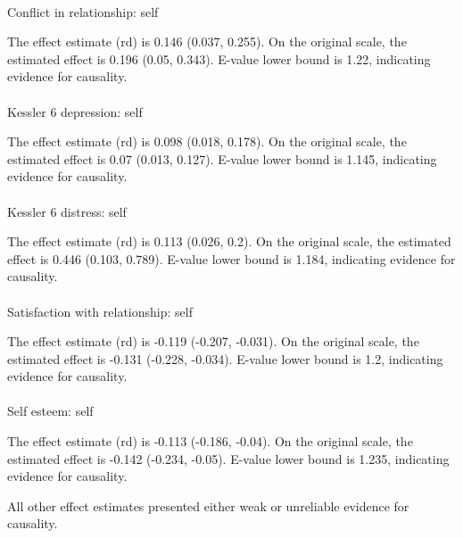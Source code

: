 \documentclass[
  single column]{article}
\makeatletter
\let\oldparagraph\paragraph
\renewcommand{\paragraph}{
    \@ifstar
      \xxxParagraphStar
      \xxxParagraphNoStar
  }
\newcommand{\xxxParagraphStar}[1]{\oldparagraph*{#1}\mbox{}}
\newcommand{\xxxParagraphNoStar}[1]{\oldparagraph{#1}\mbox{}}
\makeatother
\begin{document}
\paragraph{Conflict in relationship:
self}\label{conflict-in-relationship-self-1}

The effect estimate (rd) is 0.146 (0.037, 0.255). On the original scale,
the estimated effect is 0.196 (0.05, 0.343). E-value lower bound is
1.22, indicating evidence for causality.

\paragraph{Kessler 6 depression:
self}\label{kessler-6-depression-self-7}

The effect estimate (rd) is 0.098 (0.018, 0.178). On the original scale,
the estimated effect is 0.07 (0.013, 0.127). E-value lower bound is
1.145, indicating evidence for causality.

\paragraph{Kessler 6 distress: self}\label{kessler-6-distress-self-6}

The effect estimate (rd) is 0.113 (0.026, 0.2). On the original scale,
the estimated effect is 0.446 (0.103, 0.789). E-value lower bound is
1.184, indicating evidence for causality.

\paragraph{Satisfaction with relationship:
self}\label{satisfaction-with-relationship-self-3}

The effect estimate (rd) is -0.119 (-0.207, -0.031). On the original
scale, the estimated effect is -0.131 (-0.228, -0.034). E-value lower
bound is 1.2, indicating evidence for causality.

\paragraph{Self esteem: self}\label{self-esteem-self-9}

The effect estimate (rd) is -0.113 (-0.186, -0.04). On the original
scale, the estimated effect is -0.142 (-0.234, -0.05). E-value lower
bound is 1.235, indicating evidence for causality.

All other effect estimates presented either weak or unreliable evidence
for causality.
\end{document}
